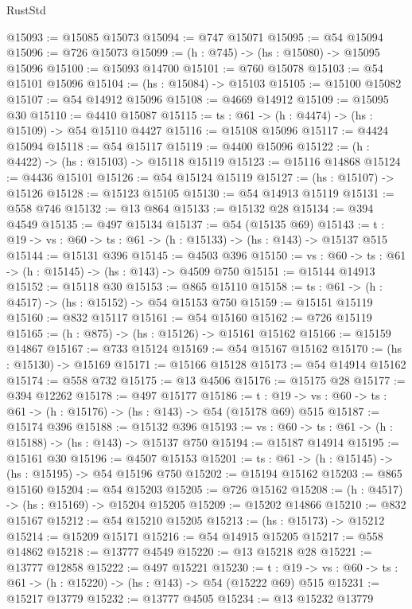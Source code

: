 \begin{lexlean}{RustStd}
\begin{coremodule}
@15093 := @15085 @15073
@15094 := @747 @15071
@15095 := @54 @15094
@15096 := @726 @15073
@15099 := (h : @745) -> (hs : @15080) -> @15095 @15096
@15100 := @15093 @14700
@15101 := @760 @15078
@15103 := @54 @15101 @15096
@15104 := (hs : @15084) -> @15103
@15105 := @15100 @15082
@15107 := @54 @14912 @15096
@15108 := @4669 @14912
@15109 := @15095 @30
@15110 := @4410 @15087
@15115 := {ts : @61} -> (h : @4474) -> (hs : @15109) -> @54 @15110 @4427
@15116 := @15108 @15096
@15117 := @4424 @15094
@15118 := @54 @15117
@15119 := @4400 @15096
@15122 := (h : @4422) -> (hs : @15103) -> @15118 @15119
@15123 := @15116 @14868
@15124 := @4436 @15101
@15126 := @54 @15124 @15119
@15127 := (hs : @15107) -> @15126
@15128 := @15123 @15105
@15130 := @54 @14913 @15119
@15131 := @558 @746
@15132 := @13 @864
@15133 := @15132 @28
@15134 := @394 @4549
@15135 := @497 @15134
@15137 := @54 (@15135 @69)
@15143 := {t : @19} -> {vs : @60} -> {ts : @61} -> (h : @15133) -> (hs : @143) -> @15137 @515
@15144 := @15131 @396
@15145 := @4503 @396
@15150 := {vs : @60} -> {ts : @61} -> (h : @15145) -> (hs : @143) -> @4509 @750
@15151 := @15144 @14913
@15152 := @15118 @30
@15153 := @865 @15110
@15158 := {ts : @61} -> (h : @4517) -> (hs : @15152) -> @54 @15153 @750
@15159 := @15151 @15119
@15160 := @832 @15117
@15161 := @54 @15160
@15162 := @726 @15119
@15165 := (h : @875) -> (hs : @15126) -> @15161 @15162
@15166 := @15159 @14867
@15167 := @733 @15124
@15169 := @54 @15167 @15162
@15170 := (hs : @15130) -> @15169
@15171 := @15166 @15128
@15173 := @54 @14914 @15162
@15174 := @558 @732
@15175 := @13 @4506
@15176 := @15175 @28
@15177 := @394 @12262
@15178 := @497 @15177
@15186 := {t : @19} ->
  {vs : @60} -> {ts : @61} -> (h : @15176) -> (hs : @143) -> @54 (@15178 @69) @515
@15187 := @15174 @396
@15188 := @15132 @396
@15193 := {vs : @60} -> {ts : @61} -> (h : @15188) -> (hs : @143) -> @15137 @750
@15194 := @15187 @14914
@15195 := @15161 @30
@15196 := @4507 @15153
@15201 := {ts : @61} -> (h : @15145) -> (hs : @15195) -> @54 @15196 @750
@15202 := @15194 @15162
@15203 := @865 @15160
@15204 := @54 @15203
@15205 := @726 @15162
@15208 := (h : @4517) -> (hs : @15169) -> @15204 @15205
@15209 := @15202 @14866
@15210 := @832 @15167
@15212 := @54 @15210 @15205
@15213 := (hs : @15173) -> @15212
@15214 := @15209 @15171
@15216 := @54 @14915 @15205
@15217 := @558 @14862
@15218 := @13777 @4549
@15220 := @13 @15218 @28
@15221 := @13777 @12858
@15222 := @497 @15221
@15230 := {t : @19} ->
  {vs : @60} -> {ts : @61} -> (h : @15220) -> (hs : @143) -> @54 (@15222 @69) @515
@15231 := @15217 @13779
@15232 := @13777 @4505
@15234 := @13 @15232 @13779

\end{coremodule}
\end{lexlean}
